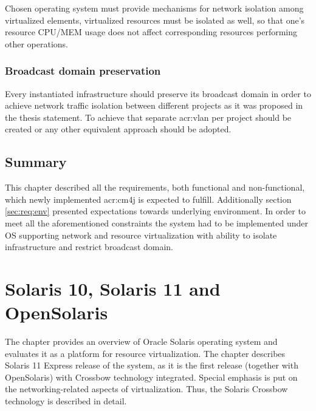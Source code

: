 \documentclass[11pt,openany]{book}
\begin{document}
        Chosen operating system must provide mechanisms for network isolation among virtualized elements, virtualized
        resources must be isolated as well, so that one's resource CPU/MEM usage does not affect corresponding resources
        performing other operations.


      \subsection{Broadcast domain preservation}
      \label{sec:req:broadcast}

        Every instantiated infrastructure should preserve its broadcast domain in order to achieve network traffic
        isolation between different projects as it was proposed in the thesis statement. To achieve that separate
        \gls{acr:vlan} per project should be created or any other equivalent approach should be adopted.



    \section*{Summary}

      This chapter described all the requirements, both functional and non-functional, which newly implemented
      \gls{acr:cm4j} is expected to fulfill. Additionally section \ref{sec:req:env} presented expectations towards
      underlying environment. In order to meet all the aforementioned constraints the system had to be implemented under
      OS supporting network and resource virtualization with ability to isolate infrastructure and restrict broadcast
      domain.


  \chapter{Solaris 10, Solaris 11 and OpenSolaris}
  \label{chap:sol}
  

    The chapter provides an overview of Oracle Solaris operating system and evaluates it as a platform for resource
    virtualization. The chapter describes Solaris 11 Express release of the system, as it is the first release (together
    with OpenSolaris) with Crossbow technology integrated. Special emphasis is put on the networking-related aspects of
    virtualization. Thus, the Solaris Crossbow technology is described in detail.
\end{document}
